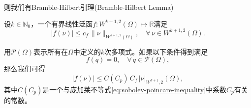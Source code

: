 则我们有Bramble-Hilbert引理(Bramble-Hilbert Lemma)
\begin{lemma}
  \label{lemma:bramble-hilbert-lemma}
  设$k \in \mathbb{N}_0$，一个有界线性泛函$f:W^{k+1,2}(\Omega) \mapsto \mathbb{R}$满足
  \begin{equation*}
    \left| f(\nu) \right| \le c_f \, \| \nu \|_{W^{k+1,2}(\Omega)}, \quad \forall \, \nu \in W^{k+1,2}(\Omega).
  \end{equation*}

用$\mathcal{P}(\Omega)$表示所有在$\Omega$中定义的$k$次多项式。如果以下条件得到满足
\begin{equation*}
  f(q) = 0, \quad \forall \, q \in \mathcal{P}(\Omega),
\end{equation*}
那么我们可得
\begin{equation}
  \label{eq:bramble-hilbert-lemma}
  \big| f(\nu) \big| \le C(C_p) \, C_f \, \big| \nu \big|_{W^{k+1},2}(\Omega),
\end{equation}
其中$C(C_p)$是一个与庞加莱不等式\eqref{eq:sobolev-poincare-inequality}中系数$C_p$有关的常数。
\end{lemma}
